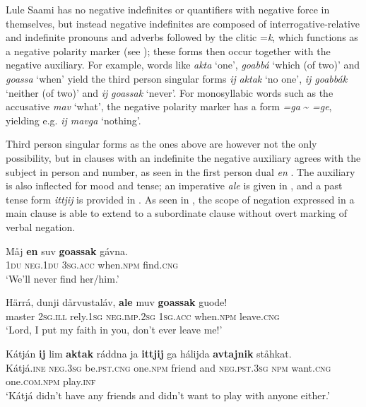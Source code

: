 \documentclass[output=paper,colorlinks,citecolor=brown]{langscibook}
\begin{document}
Lule Saami has no negative indefinites or quantifiers with negative force in themselves, but instead negative indefinites are composed of interrogative{}-relative and indefinite pronouns and adverbs followed by the clitic =\textit{k}, which functions as a negative polarity marker (see ); these forms then occur together with the negative auxiliary. For example, words like \textit{akta} ‘one’, \textit{goabbá} ‘which (of two)’ and \textit{goassa} ‘when’ yield the third person singular forms \textit{ij} \textit{aktak} ‘no one’, \textit{ij goabbák} ‘neither (of two)’ and \textit{ij} \textit{goassak} ‘never’. For monosyllabic words such as the accusative \textit{mav} ‘what\textsc{’}, the negative polarity marker has a form \textit{=ga} {\textasciitilde} \textit{=ge}, yielding e.g. \textit{ij mavga} ‘nothing’.

Third person singular forms as the ones above are however not the only possibility, but in clauses with an indefinite the negative auxiliary agrees with the subject in person and number, as seen in the first person dual \textit{en} . The auxiliary is also inflected for mood and tense; an imperative \textit{ale} is given in , and a past tense form \textit{ittjij} is provided in . As seen in , the scope of negation expressed in a main clause is able to extend to a subordinate clause without overt marking of verbal negation.

\ea\label{ex:lul:31} 
    \gll Måj \textbf{en} suv \textbf{goassak} gávna. \\ 
         \textsc{1du} \textsc{neg.1du} \textsc{3sg.acc} when.\textsc{npm} find.\textsc{cng} \\
    \glt ‘We’ll never find her/him.’ \citep{SIKOR2021}
\z 
 
\ea\label{ex:lul:32} 
    \gll Härrá, dunji dårvustaláv, \textbf{ale} muv \textbf{goassak} guode! \\ 
         master \textsc{2sg.ill} rely.\textsc{1sg} \textsc{neg.imp.2sg} \textsc{1sg.acc} when.\textsc{npm} leave.\textsc{cng} \\
    \glt ‘Lord, I put my faith in you, don’t ever leave me!’ \citep{SIKOR2021}
\z 

\ea\label{ex:lul:33} 
    \gll Kátján \textbf{ij} lim \textbf{aktak} ráddna ja \textbf{ittjij} ga hálijda \textbf{avtajnik} ståhkat.\\ 
         Kátjá.\textsc{ine} \textsc{neg.3sg} be.\textsc{pst.cng} one.\textsc{npm} friend and \textsc{neg.pst.3sg} \textsc{npm} want.\textsc{cng} one.\textsc{com.npm} play.\textsc{inf}\\
    \glt ‘Kátjá didn’t have any friends and didn’t want to play with anyone either.’ \citep{SIKOR2021}
\z 
\end{document}
